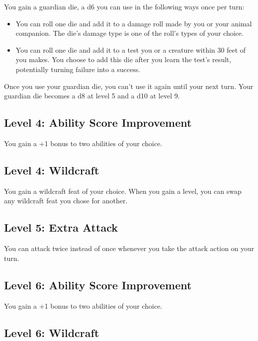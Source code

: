 \documentclass[12pt,letterpaper,twocolumn,openany,nodeprecatedcode,bg=none]{dndbook}
\providecommand{\tightlist}{%
  \setlength{\itemsep}{0pt}\setlength{\parskip}{0pt}}
\begin{document}
You gain a guardian die, a d6 you can use in the following ways once per
turn:

\begin{itemize}
\tightlist
\item
  You can roll one die and add it to a damage roll made by you or your
  animal companion. The die's damage type is one of the roll's types of
  your choice.
\item
  You can roll one die and add it to a test you or a creature within 30
  feet of you makes. You choose to add this die after you learn the
  test's result, potentially turning failure into a success.
\end{itemize}

Once you use your guardian die, you can't use it again until your next
turn. Your guardian die becomes a d8 at level 5 and a d10 at level 9.

\subsection{Level 4: Ability Score
Improvement}\label{level-4-ability-score-improvement}

You gain a +1 bonus to two abilities of your choice.

\subsection{Level 4: Wildcraft}\label{level-4-wildcraft}

You gain a wildcraft feat of your choice. When you gain a level, you can
swap any wildcraft feat you chose for another.

\subsection{Level 5: Extra Attack}\label{level-5-extra-attack}

You can attack twice instead of once whenever you take the attack action
on your turn.

\subsection{Level 6: Ability Score
Improvement}\label{level-6-ability-score-improvement}

You gain a +1 bonus to two abilities of your choice.

\subsection{Level 6: Wildcraft}\label{level-6-wildcraft}
\end{document}
